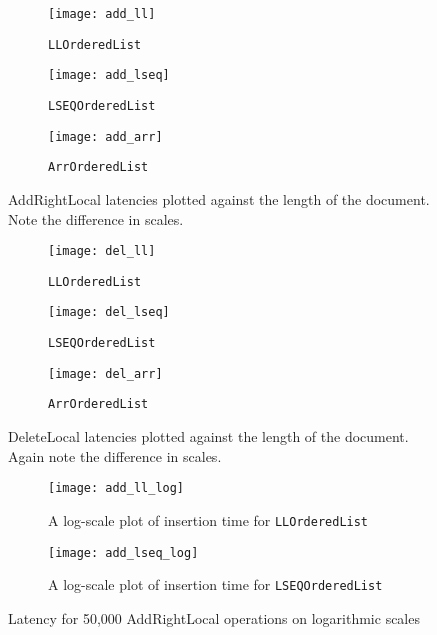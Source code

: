 \documentclass[diss.tex]{subfiles}
\begin{document}
%
%
\begin{figure}[H]
\vspace{-3cm}
\begin{subfigure}{\linewidth}
\centering
\texttt{[image: add\_ll]}
\caption{\texttt{LLOrderedList}}
\label{fig:add_ll}
\end{subfigure}

\begin{subfigure}{\linewidth}
\centering
\texttt{[image: add\_lseq]}
\caption{\texttt{LSEQOrderedList}}
\label{fig:add_lseq}
\end{subfigure}

\begin{subfigure}{\linewidth}
\centering
\texttt{[image: add\_arr]}
\caption{\texttt{ArrOrderedList}}
\label{fig:add_arr}
\end{subfigure}
\caption{AddRightLocal latencies plotted against the length of the document. Note the difference in scales.} 
\label{fig:add_latencies}
\end{figure}
%
%
%
%
%
%
\begin{figure}
\vspace{-3cm}
\begin{subfigure}{\linewidth}
\centering
\texttt{[image: del\_ll]}
\caption{\texttt{LLOrderedList}}
\label{fig:del_ll}
\end{subfigure}

\begin{subfigure}{\linewidth}
\centering
\texttt{[image: del\_lseq]}
\caption{\texttt{LSEQOrderedList}}
\label{fig:del_lseq}
\end{subfigure}

\begin{subfigure}{\linewidth}
\centering
\texttt{[image: del\_arr]}
\caption{\texttt{ArrOrderedList}}
\label{fig:del_arr}
\end{subfigure}
%
\caption{DeleteLocal latencies plotted against the length of the document. Again note the difference in scales.} 
\label{fig:del_latencies}
\end{figure}

\begin{figure}
\begin{subfigure}{\linewidth}
\centering
\texttt{[image: add\_ll\_log]}
\label{fig:ll_log}
\caption{A log-scale plot of insertion time for \texttt{LLOrderedList}}
\end{subfigure}

\begin{subfigure}{\linewidth}
\centering
\texttt{[image: add\_lseq\_log]}
\caption{A log-scale plot of insertion time for \texttt{LSEQOrderedList}}
\label{fig:lseq_log}
\end{subfigure}
%
\caption{Latency for 50,000 AddRightLocal operations on logarithmic scales}
\label{fig:logs}
\end{figure}
%
%
%
%
%
%
%
\end{document}
